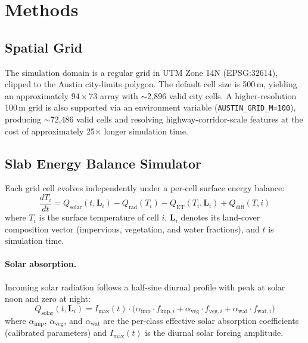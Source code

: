 \documentclass[12pt, letterpaper]{article}
\begin{document}
\section{Methods}
\label{sec:methods}

\subsection{Spatial Grid}

The simulation domain is a regular grid in UTM Zone 14N (EPSG:32614),
clipped to the Austin city-limits polygon. The default cell size is 500\,m,
yielding an approximately $94 \times 73$ array with $\sim$2,896 valid city
cells. A higher-resolution 100\,m grid is also supported via an environment
variable (\texttt{AUSTIN\_GRID\_M=100}), producing $\sim$72,486 valid cells
and resolving highway-corridor-scale features at the cost of approximately
25$\times$ longer simulation time.

\subsection{Slab Energy Balance Simulator}

Each grid cell evolves independently under a per-cell surface energy balance:
\begin{equation}
  \frac{dT_i}{dt} = Q_{\mathrm{solar}}(t, \mathbf{L}_i)
                  - Q_{\mathrm{rad}}(T_i)
                  - Q_{\mathrm{ET}}(T_i, \mathbf{L}_i)
                  + Q_{\mathrm{diff}}(T, i)
  \label{eq:energy_balance}
\end{equation}
where $T_i$ is the surface temperature of cell $i$, $\mathbf{L}_i$ denotes
its land-cover composition vector (impervious, vegetation, and water fractions),
and $t$ is simulation time.

\paragraph{Solar absorption.}
Incoming solar radiation follows a half-sine diurnal profile with peak at
solar noon and zero at night:
\begin{equation}
  Q_{\mathrm{solar}}(t, \mathbf{L}_i) = I_{\max}(t) \cdot
  \bigl(\alpha_{\mathrm{imp}} \cdot f_{\mathrm{imp},i}
       + \alpha_{\mathrm{veg}} \cdot f_{\mathrm{veg},i}
       + \alpha_{\mathrm{wat}} \cdot f_{\mathrm{wat},i}\bigr)
\end{equation}
where $\alpha_{\mathrm{imp}}$, $\alpha_{\mathrm{veg}}$, and
$\alpha_{\mathrm{wat}}$ are the per-class effective solar absorption
coefficients (calibrated parameters) and $I_{\max}(t)$ is the diurnal solar
forcing amplitude.
\end{document}
